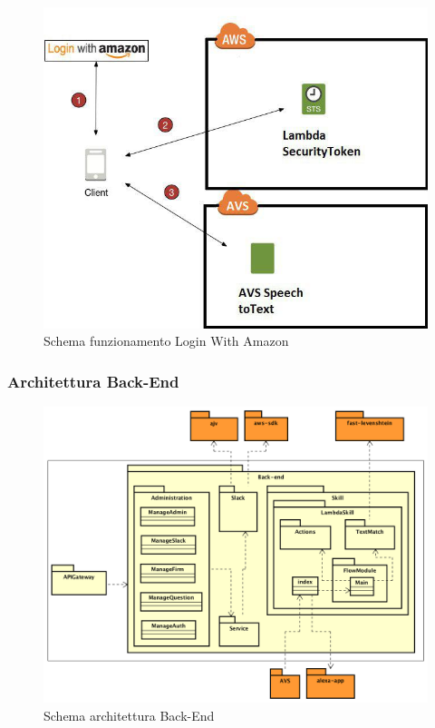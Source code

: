 \documentclass[../DefinizioneDiProdotto_v2.0.0.tex]{subfiles}
\begin{document}
\begin{figure}[!h]
	\centering
	\includegraphics[scale=0.5]{Architettura/schemaAutenticazione.jpg}
	\caption{Schema funzionamento Login With Amazon}
\end{figure}

\newpage
\subsubsection{Architettura Back-End}
\begin{figure}[!h]
	\centering
	\includegraphics[scale=0.5]{Architettura/Back-end.png}
	\caption{Schema architettura Back-End}
\end{figure}
\end{document}
